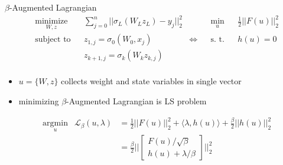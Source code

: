 \documentclass[11pt,t]{beamer}
\begin{document}
\begin{frame}[fragile]{$\beta$-Augmented Lagrangian}
	\begin{equation*}
	\begin{aligned}
	& \underset{W,z}{\text{minimize}}
	& & \sum\limits_{j=0}^{n}||\sigma_L(W_Lz_L) - y_j||^2_2 
	& & & \underset{u}{\text{min}}
	& & \frac{1}{2} ||F(u)||^2_2 \\
	& \text{subject to}
	& & z_{1,j} = \sigma_0(W_0,x_j)  
	& \Leftrightarrow & & \text{s. t.} & &  h(u) = 0\\
	& & & z_{k+1,j} = \sigma_k(W_kz_{k,j}) \\
	\end{aligned}
\end{equation*}
\begin{itemize}
\item $u = \{W,z\}$ collects weight and state variables in single vector
\item minimizing $\beta$-Augmented Lagrangian is LS problem
\end{itemize}

\begin{equation}
	\begin{aligned}
	 & \underset{u}{\text{argmin}} & \mathcal{L}_{\beta}(u,\lambda) 
	     &= \frac{1}{2} ||F(u)||^2_2 + \langle\lambda,h(u)\rangle + \frac{\beta}{2} || h(u) ||^2_2 \\
	 & & &= \frac{\beta}{2} \Big|\Big|
		\begin{bmatrix}
			F(u)/\sqrt{\beta} \\
			h(u) + \lambda/\beta
		\end{bmatrix} \Big|\Big|^2_2 \\
	\end{aligned}
	\label{loss}
\end{equation}
\end{frame}
\end{document}
